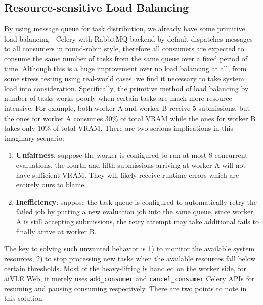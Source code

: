 \subsection{Resource-sensitive Load Balancing}
\label{ss:aivle-web-load-balancing}
By using message queue for task distribution, we already have some primitive load balancing - Celery with RabbitMQ backend by default dispatches messages to all consumers in round-robin style, therefore all consumers are expected to consume the same number of tasks from the same queue over a fixed period of time. Although this is a huge improvement over no load balancing at all, from some stress testing using real-world cases, we find it necessary to take system load into consideration. Specifically, the primitive method of load balancing by number of tasks works poorly when certain tasks are much more resource intensive. For example, both worker A and worker B receive 5 submissions, but the ones for worker A consumes 30\% of total VRAM while the ones for worker B takes only 10\% of total VRAM. There are two serious implications in this imaginary scenario:
\begin{enumerate}
    \item \textbf{Unfairness}: suppose the worker is configured to run at most 8 concurrent evaluations, the fourth and fifth submissions arriving at worker A will not have sufficient VRAM. They will likely receive runtime errors which are entirely ours to blame.
    \item \textbf{Inefficiency}: suppose the task queue is configured to automatically retry the failed job by putting a new evaluation job into the same queue, since worker A is still accepting submissions, the retry attempt may take additional fails to finally arrive at worker B.
\end{enumerate}

The key to solving such unwanted behavior is 1) to monitor the available system resources, 2) to stop processing new tasks when the available resources fall below certain thresholds. Most of the heavy-lifting is handled on the worker side, for aiVLE Web, it merely uses \texttt{add\_consumer} and \texttt{cancel\_consumer} Celery APIs for resuming and pausing consuming respectively. There are two points to note in this solution:

